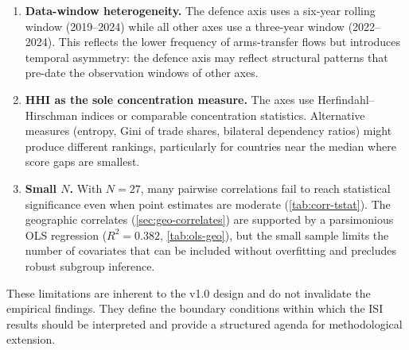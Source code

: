 \begin{enumerate}[leftmargin=2em]
  \item \textbf{Data-window heterogeneity.}
    The defence axis uses a six-year rolling window (2019--2024)
    while all other axes use a three-year window (2022--2024).
    This reflects the lower frequency of arms-transfer
    flows but introduces temporal asymmetry: the defence axis
    may reflect structural patterns that pre-date the observation
    windows of other axes.

  \item \textbf{HHI as the sole concentration measure.}
    The axes use Herfindahl--Hirschman indices or comparable
    concentration statistics.  Alternative measures (entropy,
    Gini of trade shares, bilateral dependency ratios) might
    produce different rankings, particularly for countries near
    the median where score gaps are smallest.

  \item \textbf{Small $N$.}  With $N = 27$, many pairwise
    correlations fail to reach statistical significance even when
    point estimates are moderate (\cref{tab:corr-tstat}).  The
    geographic correlates (\cref{sec:geo-correlates}) are supported
    by a parsimonious OLS regression ($R^2 = 0.382$,
    \cref{tab:ols-geo}), but the small sample limits the number of
    covariates that can be included without overfitting and precludes
    robust subgroup inference.
\end{enumerate}

\noindent These limitations are inherent to the v1.0 design and do
not invalidate the empirical findings.  They define the boundary
conditions within which the ISI results should be interpreted and
provide a structured agenda for methodological extension.
